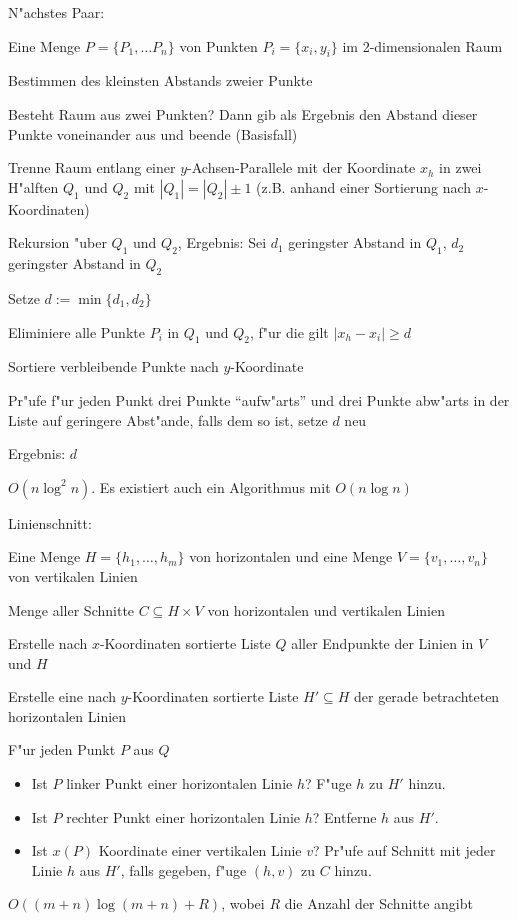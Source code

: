 \algorithm N"achstes Paar:{
  \given Eine Menge $P=\{P_1,\ldots P_n\}$ von Punkten $P_i=\{x_i,y_i\}$
  im 2-dimensionalen Raum
  
  \aim Bestimmen des kleinsten Abstands zweier Punkte
  
  \begin{proc}
    \item Besteht Raum aus zwei Punkten? Dann gib als Ergebnis den
      Abstand dieser Punkte voneinander aus und beende (Basisfall)
    \item Trenne Raum entlang einer $y$-Achsen-Parallele mit der Koordinate 
      $x_h$ in zwei H"alften $Q_1$ und $Q_2$ mit $|Q_1| = |Q_2|\pm 1$
      (z.B. anhand einer Sortierung nach $x$-Koordinaten)
    \item Rekursion "uber $Q_1$ und $Q_2$, Ergebnis: 
      Sei $d_1$ geringster Abstand in $Q_1$, $d_2$ geringster Abstand in $Q_2$
    \item Setze $d:=\min\{d_1,d_2\}$
    \item Eliminiere alle Punkte $P_i$ in $Q_1$ und $Q_2$, f"ur die 
      gilt $|x_h-x_i|\ge d$
    \item Sortiere verbleibende Punkte nach $y$-Koordinate
    \item Pr"ufe f"ur jeden Punkt drei Punkte ``aufw"arts'' und
      drei Punkte abw"arts in der Liste auf geringere Abst"ande,
      falls dem so ist, setze $d$ neu
    \item Ergebnis: $d$
  \end{proc}
  
  \cpx $O(n \log^2 n)$. Es existiert auch ein Algorithmus mit $O(n\log n)$
}
\algorithm Linienschnitt:{
  \given Eine Menge $H=\{h_1,\ldots,h_m\}$ von horizontalen und
    eine Menge $V=\{v_1,\ldots, v_n\}$ von vertikalen Linien
  
  \aim Menge aller Schnitte $C\subseteq H\times V$ von horizontalen und
    vertikalen Linien
    
  \begin{proc}
    \item Erstelle nach $x$-Koordinaten sortierte Liste $Q$ aller Endpunkte 
      der Linien in $V$ und $H$
    \item Erstelle eine nach $y$-Koordinaten sortierte Liste $H'\subseteq H$ 
      der gerade betrachteten horizontalen Linien
    \item F"ur jeden Punkt $P$ aus $Q$
      \begin{itemize}
        \item Ist $P$ linker Punkt einer horizontalen Linie $h$? 
          F"uge $h$ zu $H'$ hinzu.
        \item Ist $P$ rechter Punkt einer horizontalen Linie $h$? 
          Entferne $h$ aus $H'$. 
        \item Ist $x(P)$ Koordinate einer vertikalen Linie $v$?
          Pr"ufe auf Schnitt mit jeder Linie $h$ aus $H'$, falls gegeben, 
          f"uge $(h,v)$ zu $C$ hinzu.
      \end{itemize}
  \end{proc}
  
  \cpx $O((m+n)\log(m+n)+R)$, wobei $R$ die Anzahl der Schnitte angibt
}
